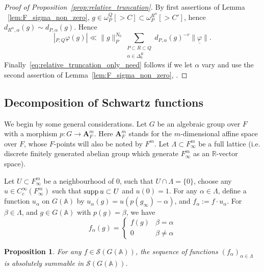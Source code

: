 \documentclass[letterpaper,11pt]{amsart}
\newcommand{\bA}{\mathbb{A}}
\newcommand{\R}{\mathbb{R}}
\newcommand{\cS}{\mathcal{S}}
\newcommand{\<}{\negthickspace}
\theoremstyle{definition}
\theoremstyle{plain}
\newtheorem{prop}[definition]{Proposition}
\theoremstyle{remark}
\numberwithin{equation}{section}
\begin{document}
\begin{proof}[Proof of Proposition~\ref{prop:relative_truncation}]
By first assertions of Lemma ~\ref{lem:F_sigma_non_zero}, $g \in
\omega_P^Q[>C] \subset \omega_P^{R^\alpha}[>C']$, hence
$d_{R^\alpha,\alpha}(g) \sim d_{P,\alpha}(g)$. Hence
    \[
    \left|  {}_{P,Q}\varphi(g) \right|
    \ll \|g\|_P^{N_0}
    \sum_{ \substack{P \subset R \subset Q \\ \alpha \in \Delta_0^R}}
    d_{P,\alpha}(g)^{-r} \| \underline{\varphi} \|.
    \]
Finally~\eqref{eq:relative_truncation_only_need} follows if we let $\alpha$
vary and use the second assertion of Lemma~\ref{lem:F_sigma_non_zero}, .
\end{proof}






\subsection{Decomposition of Schwartz functions}

\label{subsec:decomposition_of_Schwartz_functions}
We begin by some general considerations. Let $G$ be an algebraic group over $F$
with a morphism $p:G \to \mathbf{A}^m_F$. Here $\mathbf{A}^m_F$
stands for the $m$-dimensional affine space over
$F$, whose $F$-points will also be noted by $F^m$. Let $\Lambda \subset
F_\infty^m$ be a full lattice (i.e. discrete finitely generated abelian group
which generate $F_\infty^m$ as an $\R$-vector space).

Let $U \subset F^m_\infty$ be a neighbourhood of $0$, such that $U \cap
\Lambda = \{ 0 \}$, choose any $u \in C_c^\infty(F^m_\infty)$ such that
$\operatorname{supp} u \subset U$ and $u(0)=1$. For any $\alpha \in \Lambda$, define a
function $u_\alpha$ on $G(\bA)$ by $u_\alpha(g)=u(p(g_\infty)-\alpha)$, and
$f_\alpha:=f \cdot u_\alpha$. For $\beta \in \Lambda $, and $g \in G(\bA)$
with $p(g)=\beta$, we have
    \begin{equation} \label{eq:f_alpha(g)}
    f_\alpha(g) =
    \begin{cases} f(g) & \beta = \alpha \\
    0 & \beta \ne \alpha  \end{cases}
    \end{equation}

\begin{prop} \label{prop:decomposition_of_Schwartz}
For any $f \in \cS(G(\bA))$, the sequence of functions $(f_\alpha)_{\alpha \in
\Lambda}$ is absolutely summable in $\cS(G(\bA))$.
\end{prop}
\end{document}
